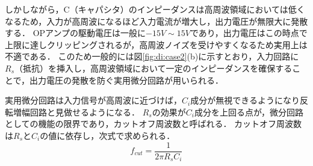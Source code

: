 \documentclass[dvipdfmx,titlepage,a4j]{jsarticle}  %
\begin{document}
しかしながら，C（キャパシタ）のインピーダンスは高周波領域においては低くなるため，入力が高周波になるほど入力電流が増大し，出力電圧が無限大に発散する．
OPアンプの駆動電圧は一般に$-15V \sim 15V$であり，出力電圧はこの時点で上限に達しクリッピングされるが，高周波ノイズを受けやすくなるため実用上は不適である．
このため一般的には図\ref{fig:di:case2}(b)に示すとおり，入力回路に$R_s$（抵抗）を挿入し，高周波領域において一定のインピーダンスを確保することで，出力電圧の発散を防ぐ実用微分回路が用いられる．

実用微分回路は入力信号が高周波に近づけば，$C_i$成分が無視できるようになり反転増幅回路と見做せるようになる．
$R_s$の効果が$C_i$成分を上回る点が，微分回路としての機能の限界であり，カットオフ周波数と呼ばれる．
カットオフ周波数は$R_s$と$C_i$の値に依存し，次式で求められる．
\begin{equation}
  f_{cut} = \frac{1}{2\pi R_s C_i}
\end{equation}
\end{document}
